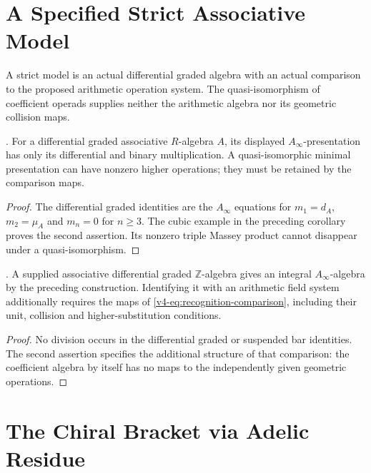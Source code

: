 \section{A Specified Strict Associative Model}
\label{v4-arith:ks:higher-products-vanish}

A strict model is an actual differential graded algebra with an
actual comparison to the proposed arithmetic operation system.
The quasi-isomorphism of coefficient operads supplies neither the
arithmetic algebra nor its geometric collision maps.

\begin{theorem}
\label{v4-arith:thm:mk-vanish}
\ClaimStatusProvedHere. For a differential graded associative
\(R\)-algebra \(A\), its displayed \(A_\infty\)-presentation has
only its differential and binary multiplication. A
quasi-isomorphic minimal presentation can have nonzero higher
operations; they must be retained by the comparison maps.
\end{theorem}

\begin{proof}
The differential graded identities are the \(A_\infty\)
equations for \(m_1=d_A\), \(m_2=\mu_A\) and
\(m_n=0\) for \(n\geq3\). The cubic example in the preceding
corollary proves the second assertion. Its nonzero triple Massey
product cannot disappear under a quasi-isomorphism.
\end{proof}

\begin{corollary}
\label{v4-arith:cor:strict-associativity-Z}
\ClaimStatusProvedHere. A supplied associative differential graded
\(\mathbb Z\)-algebra gives an integral \(A_\infty\)-algebra
by the preceding construction. Identifying it with an arithmetic
field system additionally requires the maps of
\eqref{v4-eq:recognition-comparison}, including their unit,
collision and higher-substitution conditions.
\end{corollary}

\begin{proof}
No division occurs in the differential graded or suspended bar
identities. The second assertion specifies the additional
structure of that comparison: the coefficient algebra by itself
has no maps to the independently given geometric operations.
\end{proof}

\section{The Chiral Bracket via Adelic Residue}
\label{v4-arith:ks:chiral-bracket-adelic}


